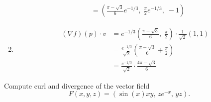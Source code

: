 \begin{solution}
\begin{enumerate}
$$\begin{aligned}
				                         & = \left( \frac{\pi - \sqrt{3}}{6} e^{-1/3}, \; \frac{\pi}{2} e^{-1/3},\; -1 \right)
			      \end{aligned}
		      $$
		\item
		      $$
			      \begin{aligned}
				      (\nabla f)(p) \cdot v & = e^{-1/3} \left( \frac{\pi - \sqrt{3}}{6}, \; \frac{\pi}{2} \right) \cdot \frac{1}{\sqrt{2}} (1,1) \\
				                            & = \frac{e^{-1/3}}{\sqrt{2}} \left( \frac{\pi - \sqrt{3}}{6} + \frac{\pi}{2} \right)                 \\
				                            & = \frac{e^{-1/3}}{\sqrt{2}} \cdot \frac{4\pi - \sqrt{3}}{6}
			      \end{aligned}
		      $$
	\end{enumerate}
\end{solution}

\begin{exercise}
	Compute curl and divergence of the vector field
	$$
		F(x,y,z) = (\sin(x)xy, \, ze^{-x}, \, yz).
	$$
\end{exercise}

